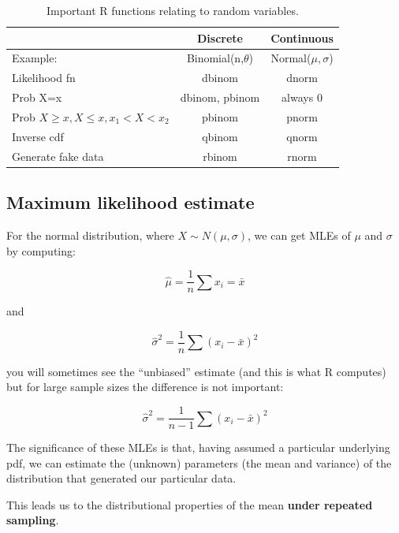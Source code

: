 \documentclass[12pt]{article}
\begin{document}
\begin{table}[!htbp]
\caption{Important R functions relating to random variables.}
\begin{center}
\begin{tabular}{|l|c|c|}
\hline
& Discrete & Continuous \\
\hline
Example: & Binomial(n,$\theta$) & Normal($\mu,\sigma$)\\
\hline
Likelihood fn & dbinom & dnorm \\ 
Prob X=x  & dbinom, pbinom & always 0 \\
Prob $X\geq x, X\leq x, x_1<X<x_2$   & pbinom & pnorm \\
Inverse cdf &  qbinom & qnorm \\
Generate fake data & rbinom & rnorm \\
\hline
\end{tabular}
\end{center}
\label{default}
\end{table}%

\subsection{Maximum likelihood estimate}

For the normal distribution, where $X \sim N(\mu,\sigma)$, we can get MLEs of $\mu$ and $\sigma$ by computing:

\begin{equation}
  \hat \mu = \frac{1}{n}\sum x_i = \bar{x}  
\end{equation}

and

\begin{equation}
	\hat \sigma ^2 = \frac{1}{n}\sum (x_i-\bar{x})^2
\end{equation}

you will sometimes see the ``unbiased'' estimate (and this is what R computes) but for large sample sizes the difference is not important:

\begin{equation}
  \hat \sigma ^2 = \frac{1}{n-1}\sum (x_i-\bar{x})^2
\end{equation}

The significance of these MLEs is that, having assumed a particular underlying pdf, we can estimate the (unknown) parameters (the mean and variance) of the distribution that generated our particular data. 

This leads us to the distributional properties of the mean \textbf{under repeated sampling}.
\end{document}
